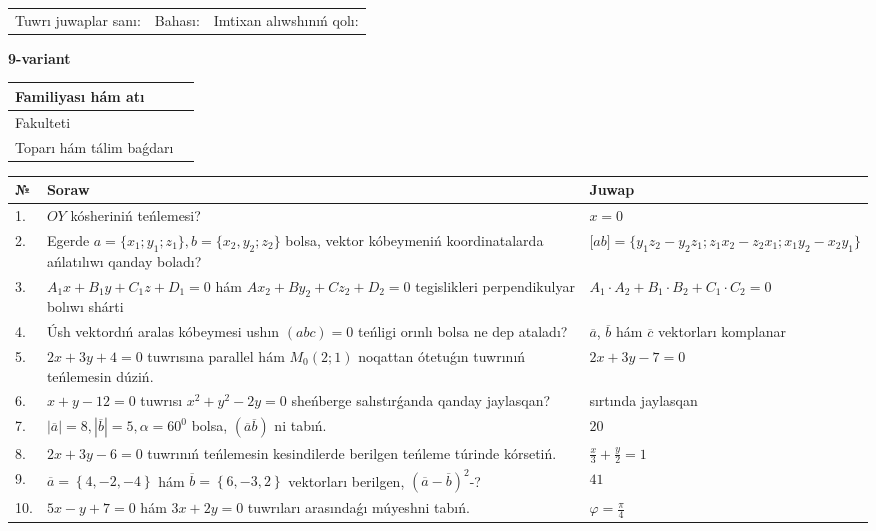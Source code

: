 \documentclass{article}
\begin{document}
\vspace{1cm}

\begin{tabular}{lll}
Tuwrı juwaplar sanı: \underline{\hspace{1.5cm}} & 
Bahası: \underline{\hspace{1.5cm}} & 
Imtixan alıwshınıń qolı: \underline{\hspace{2cm}} \\
\end{tabular}

\egroup

\newpage


\textbf{9-variant}\\

\bgroup
\def\arraystretch{1.6} %

\begin{tabular}{|m{5.7cm}|m{9.5cm}|}
\hline
Familiyası hám atı & \\
\hline
Fakulteti  & \\
\hline
Toparı hám tálim baǵdarı  & \\
\hline
\end{tabular}

\vspace{1cm}

\begin{tabular}{|m{0.7cm}|m{10cm}|m{4cm}|}
\hline
№ & Soraw & Juwap \\
\hline
1. & $OY$ kósheriniń teńlemesi? & $x=0$ \\
\hline
2. & Egerde $a=\{ x_1; y_1; z_1\}, b=\{ x_2, y_2; z_2\}$ bolsa, vektor kóbeymeniń koordinatalarda ańlatılıwı qanday boladı? &  $\lbrack ab\rbrack=\{y_1z_2-y_2z_1; z_1x_2-z_2x_1; x_1y_2-x_2y_1\}$ \\
\hline
3. & $A_1x+B_1y+C_1z+D_1=0$ hám $Ax_2+By_2+Cz_2+D_2=0$ tegislikleri perpendikulyar bolıwı shárti & $A_1\cdot A_2+B_1\cdot B_2+C_1\cdot C_2=0$ \\
\hline
4. & Úsh vektordıń aralas kóbeymesi ushın $(abc)=0$ teńligi orınlı bolsa ne dep ataladı? & $\overline{a}$, $\overline{b}$ hám $\overline{c}$ vektorları komplanar \\
\hline
5. & $2x+3y+4=0$ tuwrısına parallel hám $M_{0} (2;1)$ noqattan ótetuǵın tuwrınıń teńlemesin dúziń. & $2x+3y-7=0$ \\
\hline
6. & $x+y-12=0$ tuwrısı $x^{2}+y^{2}-2y=0$ sheńberge salıstırǵanda qanday jaylasqan? & sırtında jaylasqan \\
\hline
7. & $\left| \overline{a} \right|=8, \left| \overline{b} \right|=5, \alpha=60^{0}$ bolsa, $( \overline{a}\overline{b} )$ ni tabıń. & $20$ \\
\hline
8. & $2x+3y-6=0$ tuwrınıń teńlemesin kesindilerde berilgen teńleme túrinde kórsetiń. & $\frac{x}{3} + \frac{ y }{ 2 } =  1$ \\
\hline
9. & $\overline{a}=\left\{ 4,-2,-4 \right\}$ hám $\overline{b}=\left\{ 6,-3, 2 \right\}$ vektorları berilgen, $(\overline{a}-\overline{b}) ^{2}$-? & $41$ \\
\hline
10. & $5x-y+7=0$ hám $3x+2y=0$ tuwrıları arasındaǵı múyeshni tabıń. & $\varphi=\frac{\pi}{4}$ \\
\hline
\end{tabular}
\end{document}
